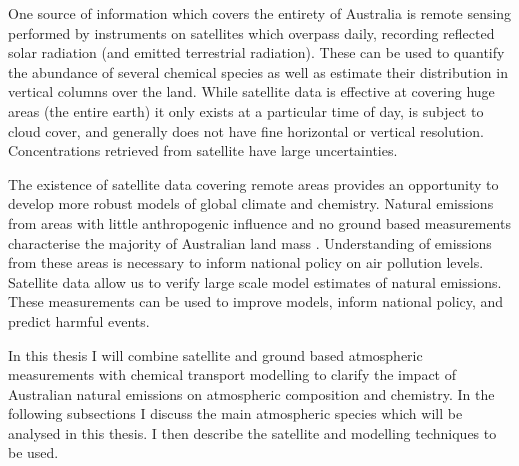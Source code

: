 One source of information which covers the entirety of Australia is remote sensing performed by instruments on satellites which overpass daily, recording reflected solar radiation (and emitted terrestrial radiation).
These can be used to quantify the abundance of several chemical species as well as estimate their distribution in vertical columns over the land.
While satellite data is effective at covering huge areas (the entire earth) it only exists at a particular time of day, is subject to cloud cover, and generally does not have fine horizontal or vertical resolution.
Concentrations retrieved from satellite have large uncertainties.

The existence of satellite data covering remote areas provides an opportunity to develop more robust models of global climate and chemistry.
Natural emissions from areas with little anthropogenic influence and no ground based measurements characterise the majority of Australian land mass \cite{VanDerA_2008}.
Understanding of emissions from these areas is necessary to inform national policy on air pollution levels.
Satellite data allow us to verify large scale model estimates of natural emissions.
These measurements can be used to improve models, inform national policy, and predict harmful events.

In this thesis I will combine satellite and ground based atmospheric measurements with chemical transport modelling to clarify the impact of Australian natural emissions on atmospheric composition and chemistry.
In the following subsections I discuss the main atmospheric species which will be analysed in this thesis.
I then describe the satellite and modelling techniques to be used.
